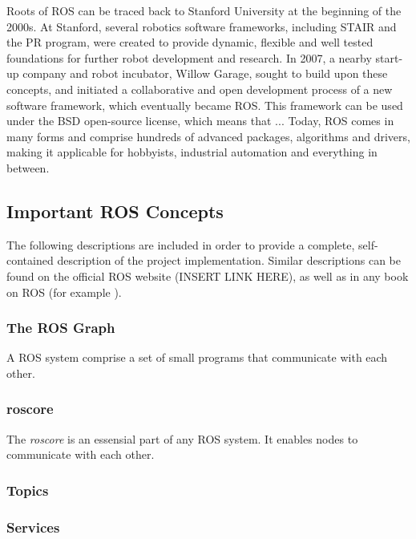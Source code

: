 Roots of \ac{ROS} can be traced back to Stanford University at the beginning of the 2000s. At Stanford, several robotics software frameworks, including \ac{STAIR} and the \ac{PR} program, were created to provide dynamic, flexible and well tested foundations for further robot development and research. In 2007, a nearby start-up company and robot incubator, Willow Garage, sought to build upon these concepts, and initiated a collaborative and open development process of a new software framework, which eventually became \ac{ROS}\cite{ROS_history}\cite{rosbook15}. This framework can be used under the BSD open-source license, which means that ...\cite{BCD_license} Today, \ac{ROS} comes in many forms and comprise hundreds of advanced packages, algorithms and drivers, making it applicable for hobbyists, industrial automation and everything in between. 

\subsection{Important ROS Concepts}

The following descriptions are included in order to provide a complete, self-contained description of the project implementation. Similar descriptions can be found on the official \ac{ROS} website (INSERT LINK HERE), as well as in any book on \ac{ROS} (for example \cite{rosbook15}). 

\subsubsection{The ROS Graph}

A \ac{ROS} system comprise a set of small programs that communicate with each other. 

\subsubsection{roscore}

The \textit{roscore} is an essensial part of any \ac{ROS} system. It enables nodes to communicate with each other.

\subsubsection{Topics}

\subsubsection{Services}

